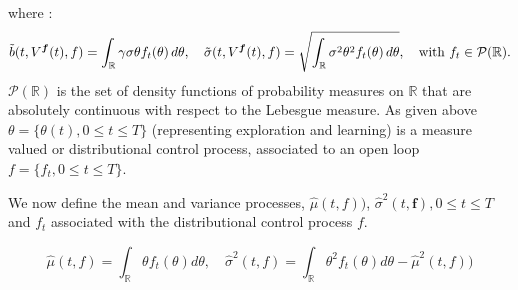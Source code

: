 \documentclass[oneside, a4paper, onecolumn, 11pt]{article}
\begin{document}
where : 
\begin{equation}
\Tilde{b}(t, V^{\boldsymbol{f}}(t), f) = \int_{\mathbb{R}} \gamma \sigma \theta f_t(\theta) \, d\theta,  \quad 
\Tilde{\sigma}(t, V^{\boldsymbol{f}}(t), f) = \sqrt{\int_{\mathbb{R}} \sigma^2 \theta^2 f_t(\theta) \, d\theta}, \quad \text{with }f_t \in \mathcal{P}(\mathbb{R}).    
\end{equation} 
$\mathcal{P}(\mathbb{R})$ is the set of density functions of probability measures on $\mathbb{R}$ that are absolutely continuous with respect to the Lebesgue measure. As given above $\theta = \{\theta(t), 0 \leq t \leq T\} $ (representing exploration and learning) is a measure valued or distributional control process, associated to an open loop $f = \{f_t, 0 \leq t \leq T\}$.

We now define the mean and variance processes, $\hat{\mu}(t,f))$, $\hat{\sigma}^2(t,\boldsymbol{f}) , 0 \leq t \leq T$ and $f_t$  associated with the distributional control process $f$. 


\begin{equation}
\hat{\mu}(t,f) = \int_{\mathbb{R}} \theta f_t(\theta) d\theta,  \quad \hat{\sigma}^2(t,f) = \int_{\mathbb{R}} \theta^2 f_t(\theta) d\theta - \hat{\mu}^2(t,f))
\end{equation}
\end{document}
